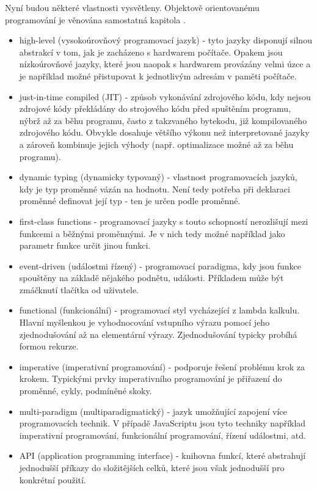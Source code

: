\documentclass[main.tex]{subfiles}
\begin{document}
Nyní budou některé vlastnosti vysvětleny. Objektově orientovanému programování je věnována samostatná kapitola .
\begin{itemize}
    \item high-level (vysokoúrovňový programovací jazyk) - tyto jazyky disponují silnou abstrakcí v tom, jak je zacházeno s hardwarem počítače. Opakem jsou nízkoúrovňové jazyky, které jsou naopak s hardwarem provázány velmi úzce a je například možné přistupovat k jednotlivým adresám v paměti počítače.
    \item just-in-time compiled (JIT) - způsob vykonávání zdrojového kódu, kdy nejsou zdrojové kódy překládány do strojového kódu před spuštěním programu, nýbrž až za běhu programu, často z takzvaného bytekodu, již kompilovaného zdrojového kódu. Obvykle dosahuje většího výkonu než interpretované jazyky a zároveň kombinuje jejich výhody (např. optimalizace možné až za běhu programu).
    \item dynamic typing (dynamicky typovaný) - vlastnost programovacích jazyků, kdy je typ proměnné vázán na hodnotu. Není tedy potřeba při deklaraci proměnné definovat její typ - ten je určen podle proměnné.
    \item first-class functions - programovací jazyky s touto schopností nerozlišují mezi funkcemi a běžnými proměnnými. Je v nich tedy možné například jako parametr funkce určit jinou funkci.

    \item event-driven (událostmi řízený) - programovací paradigma, kdy jsou funkce spouštěny na základě nějakého podnětu, události. Příkladem může být zmáčknutí tlačítka od uživatele. 
    \item functional (funkcionální) - programovací styl vycházející z lambda kalkulu. Hlavní myšlenkou je vyhodnocování vstupního výrazu pomocí jeho zjednodušování až na elementární výrazy. Zjednodušování typicky probíhá formou rekurze. 
    \item imperative (imperativní programování) - podporuje řešení problému krok za krokem. Typickými prvky imperativního programování je přiřazení do proměnné, cykly, podmíněné skoky.  

    \item multi-paradigm (multiparadigmatický) - jazyk umožňující zapojení více programovacích technik. V případě JavaScriptu jsou tyto techniky například imperativní programování, funkcionální programování, řízení událostmi, atd. 

    \item API (application programming interface) - knihovna funkcí, které abstrahují jednodušší příkazy do složitějších celků, které jsou však jednodušší pro konkrétní použití. 
	\cite{web:wik:cz:js, web:wik:en:js} 
\end{itemize}
\end{document}
